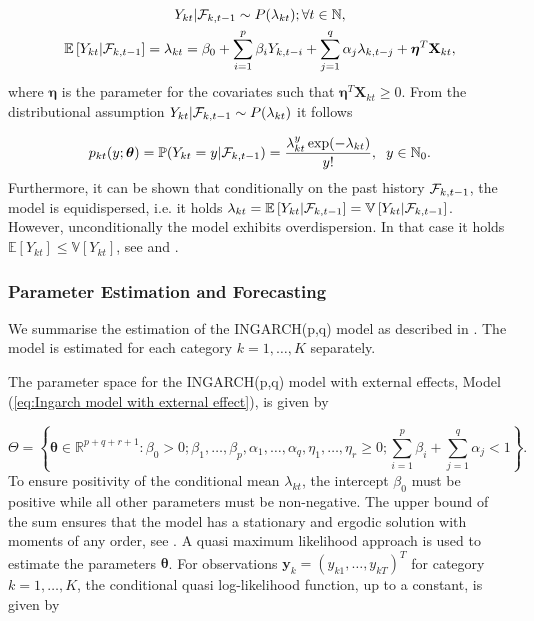 \begin{equation}
\begin{gathered}
\label{eq:Ingarch model with external effect}
Y_{kt} | \mathcal{F}_{k,t-1} \sim P(\lambda_{kt}); \forall t \in \mathbb{N}, \\
\mathbb{E}\left[Y_{kt} | \mathcal{F}_{k,t-1} \right] = \lambda_{kt} = \beta_0 + \sum_{i=1}^p\beta_i Y_{k,t-i} + \sum_{j=1}^q\alpha_j \lambda_{k,t-j} + \bm{\eta}^T\textbf{X}_{kt},
\end{gathered}
\end{equation}
%
where $\bm{\eta}$ is the parameter for the covariates such that $\bm{\eta}^T\textbf{X}_{kt} \geq 0$.
From the distributional assumption $Y_{kt} | \mathcal{F}_{k,t-1} \sim P(\lambda_{kt})$ it follows

\begin{equation}
p_{kt}(y;\bm{\theta})=\mathbb{P}(Y_{kt}=y | \mathcal{F}_{k,t-1}) = \frac{\lambda_{kt}^y \exp(-\lambda_{kt})}{y!}, \hspace{0.2cm} y \in \mathbb{N}_0.
\label{eq:Ingarch Distribution}
\end{equation}
%
Furthermore, it can be shown that conditionally on the past history $\mathcal{F}_{k,t-1}$, the model is equidispersed, i.e. it holds $\lambda_{kt} = \mathbb{E}\left[Y_{kt} | \mathcal{F}_{k,t-1}\right] = \mathbb{V}\left[Y_{kt} | \mathcal{F}_{k,t-1}\right]$. However, unconditionally the model exhibits overdispersion. In that case it holds $\mathbb{E}\left[Y_{kt}\right] \leq \mathbb{V}\left[Y_{kt}\right] $, see \textcite{Liboschik:2016} and \textcite{Heinen:2003}. 

\subsubsection{Parameter Estimation and Forecasting}
\label{sec: Estimation of the Ingarch Model}

We summarise the estimation of the INGARCH(p,q) model as described in \textcite{Liboschik:2016}. The model is estimated for each category $k=1,\ldots,K$ separately. 

The parameter space for the INGARCH(p,q) model with external effects, Model (\ref{eq:Ingarch model with external effect}), is given by 

\begin{equation}
\Theta = \left\{ \bm{\theta} \in \mathbb{R}^{p+q+r+1}: \beta_0 > 0; \beta_1,\ldots,\beta_p,\alpha_1,\ldots,\alpha_q,\eta_1,\ldots,\eta_r \geq 0; \sum_{i=1}^p\beta_i + \sum_{j=1}^q\alpha_j < 1 \right\}.
\label{eq:Ingarch parameter space}
\end{equation}
%
To ensure positivity of the conditional mean $\lambda_{kt}$, the intercept $\beta_0$ must be positive while all other parameters must be non-negative. The upper bound of the sum ensures that the model has a stationary and ergodic solution with moments of any order, see \textcite{Ferland:2006,Fokianos:2009,Doukhan:2012}. A quasi maximum likelihood approach is used to estimate the parameters $\bm{\theta}$. 
For observations $\textbf{y}_k = \left(y_{k1},\ldots,y_{kT}\right)^T$ for category $k=1,\ldots,K$, the conditional quasi log-likelihood function, up to a constant, is given by

